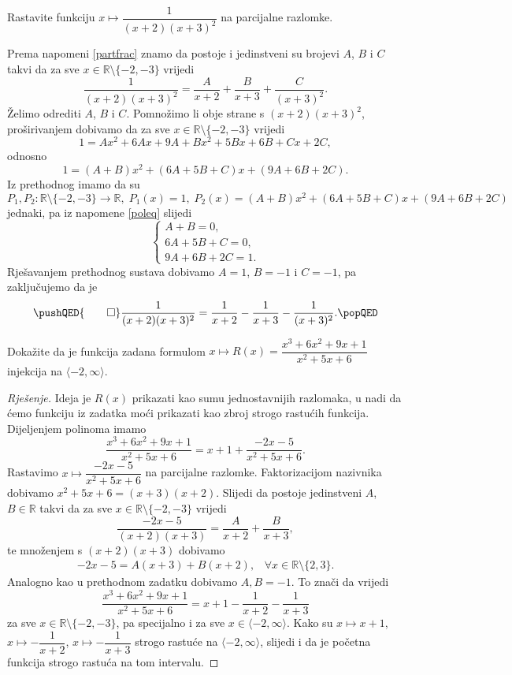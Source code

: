 \begin{exercise}
Rastavite funkciju $x\mapsto \dfrac{1}{(x+2)(x+3)^2}$ na parcijalne razlomke.
\end{exercise}
\begin{proof*}
Prema napomeni \ref{partfrac} znamo da postoje i jedinstveni su brojevi $A$, $B$ i $C$ takvi da za sve $x\in \mathbb{R}\setminus\{-2, -3\}$ vrijedi
$$\dfrac{1}{(x+2)(x+3)^2}=\dfrac{A}{x+2}+\dfrac{B}{x+3}+\dfrac{C}{(x+3)^2}.$$
Želimo odrediti $A$, $B$ i $C$. Pomnožimo li obje strane s $(x+2)(x+3)^2$, proširivanjem dobivamo da za sve $x\in \mathbb{R}\setminus\{-2, -3\}$ vrijedi
$$1=Ax^2+6Ax+9A+Bx^2+5Bx+6B+Cx+2C,$$
odnosno
$$1=(A+B)x^2+(6A+5B+C)x+(9A+6B+2C).$$
Iz prethodnog imamo da su $$P_1, P_2 : \mathbb{R}\setminus\{-2, -3\}\to \mathbb{R},\;P_1(x)=1,\; P_2(x)= (A+B)x^2+(6A+5B+C)x+(9A+6B+2C)$$ jednaki, pa iz napomene \ref{poleq} slijedi
$$\begin{cases}
A+B=0, \\
6A+5B+C=0, \\
9A+6B+2C=1.
   \end{cases}$$
Rješavanjem prethodnog sustava dobivamo $A=1$, $B=-1$ i $C=-1$, pa zaključujemo da je
\[
\pushQED{\qed}
\dfrac{1}{(x+2)(x+3)^2}=\dfrac{1}{x+2}-\dfrac{1}{x+3}-\dfrac{1}{(x+3)^2}.\qedhere
\popQED
\]
\end{proof*}
\begin{exercise}
Dokažite da je funkcija zadana formulom $x\mapsto R(x)=\dfrac{x^3+6x^2+9x+1}{x^2+5x+6}$ injekcija na $\langle -2, \infty\rangle$.
\end{exercise}
\begin{proof}[Rješenje]
Ideja je $R(x)$ prikazati kao sumu jednostavnijih razlomaka, u nadi da ćemo funkciju iz zadatka moći prikazati kao zbroj strogo rastućih funkcija. Dijeljenjem polinoma imamo
$$\dfrac{x^3+6x^2+9x+1}{x^2+5x+6}=x+1+\dfrac{-2x-5}{x^2+5x+6}.$$
Rastavimo $x\mapsto \dfrac{-2x-5}{x^2+5x+6}$ na parcijalne razlomke. Faktorizacijom nazivnika dobivamo $x^2+5x+6=(x+3)(x+2)$. Slijedi da postoje jedinstveni $A$, $B\in \mathbb{R}$ takvi da za sve $x\in \mathbb{R}\setminus\{-2, -3\}$ vrijedi
$$\dfrac{-2x-5}{(x+2)(x+3)}=\dfrac{A}{x+2}+\dfrac{B}{x+3},$$
te množenjem s $(x+2)(x+3)$ dobivamo 
\begin{gather}
\label{partfrac2}
-2x-5=A(x+3)+B(x+2),\;\;\; \forall x\in \mathbb{R}\setminus\{2, 3\}.
\end{gather}
Analogno kao u prethodnom zadatku dobivamo $A, B=-1$. To znači da vrijedi
$$\dfrac{x^3+6x^2+9x+1}{x^2+5x+6}=x+1-\dfrac{1}{x+2}-\dfrac{1}{x+3}$$
za sve $x\in \mathbb{R}\setminus\{-2, -3\}$, pa specijalno i za sve $x\in\langle -2,\infty \rangle$. Kako su $x\mapsto x+1$, $x\mapsto -\dfrac{1}{x+2}$, $x\mapsto -\dfrac{1}{x+3}$ strogo rastuće na $\langle -2,\infty \rangle$, slijedi i da je početna funkcija strogo rastuća na tom intervalu.
\end{proof}
